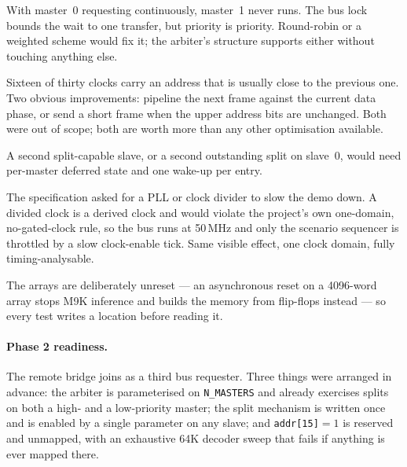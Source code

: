 \documentclass[11pt,a4paper]{article}
\newcommand{\sig}[1]{\texttt{#1}}
\begin{document}
\begin{description}[leftmargin=1.4em,style=nextline,font=\bfseries]
\item[Fixed priority can starve the low-priority master.]
With master~0 requesting continuously, master~1 never runs. The bus lock
bounds the wait to one transfer, but priority is priority. Round-robin or a
weighted scheme would fix it; the arbiter's structure supports either without
touching anything else.

\item[The address frame dominates latency.]
Sixteen of thirty clocks carry an address that is usually close to the
previous one. Two obvious improvements: pipeline the next frame against the
current data phase, or send a short frame when the upper address bits are
unchanged. Both were out of scope; both are worth more than any other
optimisation available.

\item[One split outstanding.]
A second split-capable slave, or a second outstanding split on slave~0, would
need per-master deferred state and one wake-up per entry.

\item[Board demo throttling, not clock division.]
The specification asked for a PLL or clock divider to slow the demo down. A
divided clock is a derived clock and would violate the project's own
one-domain, no-gated-clock rule, so the bus runs at 50\,MHz and only the
scenario sequencer is throttled by a slow clock-enable tick. Same visible
effect, one clock domain, fully timing-analysable.

\item[Memory contents are undefined at power-up.]
The arrays are deliberately unreset --- an asynchronous reset on a 4096-word
array stops M9K inference and builds the memory from flip-flops instead ---
so every test writes a location before reading it.
\end{description}

\paragraph{Phase 2 readiness.} The remote bridge joins as a third bus
requester. Three things were arranged in advance: the arbiter is
parameterised on \sig{N\_MASTERS} and already exercises splits on both a
high- and a low-priority master; the split mechanism is written once and is
enabled by a single parameter on any slave; and \sig{addr[15]}${=}1$ is
reserved and unmapped, with an exhaustive 64K decoder sweep that fails if
anything is ever mapped there.
\end{document}

